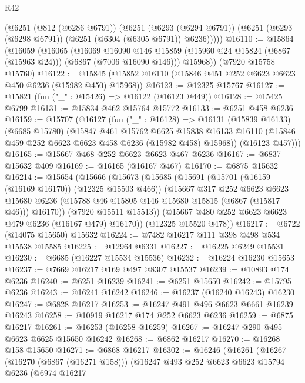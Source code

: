 \begin{lexlean}{R42}
\begin{coremodule}
{      (@6251
        (@812 (@6286 @6791))
        (@6251
          (@6293 (@6294 @6791))
          (@6251 (@6293 (@6298 @6791)) (@6251 (@6304 (@6305 @6791)) @6236)))))
@16110 := @15864
    (@16059
      (@16065
        (@16069
          @16090
          @146
          @15859
          (@15960 @24 @15824 (@6867 (@15963 @24)))
          (@6867 (@7006 @16090 @146)))
        @15968))
    (@7920 @15758 @15760)
@16122 := @15845 (@15852 @16110 (@15846 @451 @252 @6623 @6623 @450 @6236 (@15982 @450) @15968))
@16123 := @12325 @15767
@16127 := @15821 (fun ("_" : @15426) => @16122 (@16123 @449))
@16128 := @15425 @6799
@16131 := @15834 @462 @15764 @15772
@16133 := @6251 @458 @6236
@16159 := @15707
    (@16127
      (fun ("_" : @16128) =>
      @16131
        (@15839 @16133)
        (@6685 @15780)
        (@15847
          @461
          @15762
          @6625
          @15838
          @16133
          @16110
          (@15846 @459 @252 @6623 @6623 @458 @6236 (@15982 @458) @15968))
        (@16123 @457)))
@16165 := @15667 @468 @252 @6623 @6623 @467 @6236
@16167 := @6837 @15632 @409
@16169 := @16165 (@16167 @467)
@16170 := @6875 @15632
@16214 := @15654
    (@15666
      (@15673
        (@15685
          (@15691
            (@15701 (@16159 (@16169 @16170)) (@12325 @15503 @466))
            (@15667
              @317
              @252
              @6623
              @6623
              @15680
              @6236
              (@15788 @46 @15805 @146 @15680 @15815 (@6867 (@15817 @46)))
              @16170))
          (@7920 @15511 @15513))
        (@15667 @480 @252 @6623 @6623 @479 @6236 (@16167 @479) @16170))
      (@12325 @15520 @478))
@16217 := @6722 (@14075 @15650) @15632
@16224 := @7482 @16217 @111 @398 @498 @534 @15538 @15585
@16225 := @12964 @6331
@16227 := @16225 @6249 @15531
@16230 := @6685 (@16227 @15534 @15536)
@16232 := @16224 @16230 @15653
@16237 := @7669 @16217 @169 @497 @8307 @15537
@16239 := @10893 @174 @6236
@16240 := @6251 @16239
@16241 := @6251 @15650
@16242 := @15795 @6236
@16243 := @16241 @16242
@16246 := @16237 (@16240 @16243) @16230
@16247 := @6828 @16217
@16253 := @16247 @491 @496 @6623 @6661 @16239 @16243
@16258 := @10919 @16217 @174 @252 @6623 @6236
@16259 := @6875 @16217
@16261 := @16253 (@16258 @16259)
@16267 := @16247 @290 @495 @6623 @6625 @15650 @16242
@16268 := @6862 @16217
@16270 := @16268 @158 @15650
@16271 := @6868 @16217
@16302 := @16246
    (@16261
      (@16267
        (@16270 (@6867 (@16271 @158)))
        (@16247
          @493
          @252
          @6623
          @6623
          @15794
          @6236
          (@6974
            @16217
}
\end{coremodule}
\end{lexlean}
